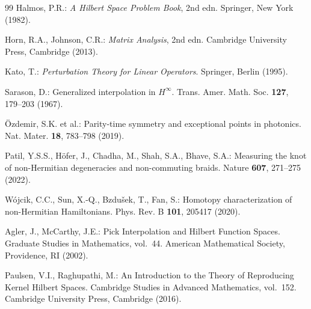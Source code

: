 \documentclass[11pt]{article}
\numberwithin{equation}{section}
\begin{document}
\begin{thebibliography}{99}
Halmos, P.R.: \emph{A Hilbert Space Problem Book}, 2nd edn. Springer, New York (1982).

Horn, R.A., Johnson, C.R.: \emph{Matrix Analysis}, 2nd edn. Cambridge
University Press, Cambridge (2013).

Kato, T.: \emph{Perturbation Theory for Linear Operators}. Springer,
Berlin (1995).

Sarason, D.: Generalized interpolation in \(H^\infty\). Trans. Amer. Math.
Soc. \textbf{127}, 179--203 (1967).

\"{O}zdemir, S.K. et al.: Parity-time symmetry and exceptional points in
photonics. Nat. Mater. \textbf{18}, 783--798 (2019).

Patil, Y.S.S., H\"{o}fer, J., Chadha, M., Shah, S.A., Bhave, S.A.:
Measuring the knot of non-Hermitian degeneracies and non-commuting braids.
Nature \textbf{607}, 271--275 (2022).

W\'{o}jcik, C.C., Sun, X.-Q., Bzdu\v{s}ek, T., Fan, S.: Homotopy
characterization of non-Hermitian Hamiltonians. Phys. Rev. B \textbf{101},
205417 (2020).

Agler, J., McCarthy, J.E.: Pick Interpolation and Hilbert Function Spaces.
Graduate Studies in Mathematics, vol.~44. American Mathematical Society,
Providence, RI (2002).

Paulsen, V.I., Raghupathi, M.: An Introduction to the Theory of Reproducing
Kernel Hilbert Spaces. Cambridge Studies in Advanced Mathematics, vol.~152.
Cambridge University Press, Cambridge (2016).

\end{thebibliography}
\end{document}
